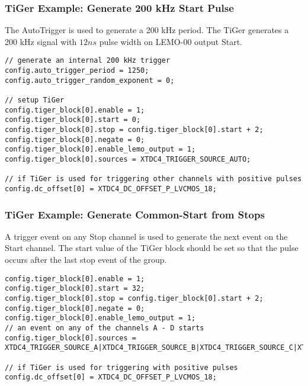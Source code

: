 \subsubsection{TiGer Example: Generate 200 kHz Start Pulse}
The AutoTrigger is used to generate a 200 kHz period. The TiGer generates a 200 kHz signal with $12 ns$ pulse width on LEMO-00 output Start.
\begin{lstlisting}[frame=tlrb]
// generate an internal 200 kHz trigger
config.auto_trigger_period = 1250;
config.auto_trigger_random_exponent = 0;

// setup TiGer
config.tiger_block[0].enable = 1;
config.tiger_block[0].start = 0;
config.tiger_block[0].stop = config.tiger_block[0].start + 2;
config.tiger_block[0].negate = 0;
config.tiger_block[0].enable_lemo_output = 1;
config.tiger_block[0].sources = XTDC4_TRIGGER_SOURCE_AUTO;

// if TiGer is used for triggering other channels with positive pulses
config.dc_offset[0] = XTDC4_DC_OFFSET_P_LVCMOS_18; 
\end{lstlisting}

\subsubsection{TiGer Example: Generate Common-Start from Stops}
A trigger event on any Stop channel is used to generate the next event on the Start channel. 
The start value of the TiGer block should be set so that the pulse occurs after the last stop event of the group.
\begin{lstlisting}[frame=tlrb]
config.tiger_block[0].enable = 1;
config.tiger_block[0].start = 32;
config.tiger_block[0].stop = config.tiger_block[0].start + 2;
config.tiger_block[0].negate = 0;
config.tiger_block[0].enable_lemo_output = 1;
// an event on any of the channels A - D starts 
config.tiger_block[0].sources = XTDC4_TRIGGER_SOURCE_A|XTDC4_TRIGGER_SOURCE_B|XTDC4_TRIGGER_SOURCE_C|XTDC4_TRIGGER_SOURCE_D;

// if TiGer is used for triggering with positive pulses
config.dc_offset[0] = XTDC4_DC_OFFSET_P_LVCMOS_18; 
\end{lstlisting}
